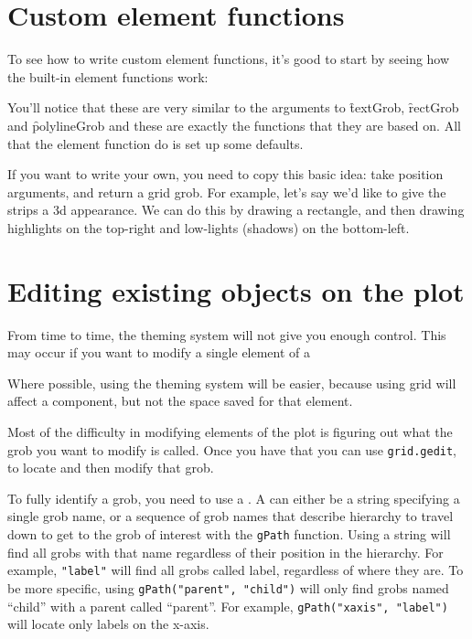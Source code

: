 \section{Custom element functions}
\label{sec:custom-elements}

To see how to write custom element functions, it's good to start by seeing how the built-in element functions work:

% 


You'll notice that these are very similar to the arguments to \f{textGrob}, \f{rectGrob} and \f{polylineGrob} and these are exactly the functions that they are based on.  All that the element function do is set up some defaults.  

If you want to write your own, you need to copy this basic idea: take position arguments, and return a grid grob.  For example, let's say we'd like to give the strips a 3d appearance.  We can do this by drawing a rectangle, and then drawing highlights on the top-right and low-lights (shadows) on the bottom-left.


\section{Editing existing objects on the plot}
\label{sec:grid-existing}

From time to time, the theming system will not give you enough control.  This may occur if you want to modify a single element of a 

Where possible, using the theming system will be easier, because using grid will affect a component, but not the space saved for that element.

Most of the difficulty in modifying elements of the plot is figuring out what the grob you want to modify is called.  Once you have that you can use {\tt grid.gedit}, to locate and then modify that grob. 

To fully identify a grob, you need to use a .  A  can either be a string specifying a single grob name, or a sequence of grob names that describe hierarchy to travel down to get to the grob of interest with the {\tt gPath} function.  Using a string will find all grobs with that name regardless of their position in the hierarchy.  For example, {\tt "label"} will find all grobs called label, regardless of where they are.  To be more specific, using {\tt gPath("parent", "child")} will only find grobs named ``child'' with a parent called ``parent''.  For example, {\tt gPath("xaxis", "label")} will locate only labels on the x-axis.

